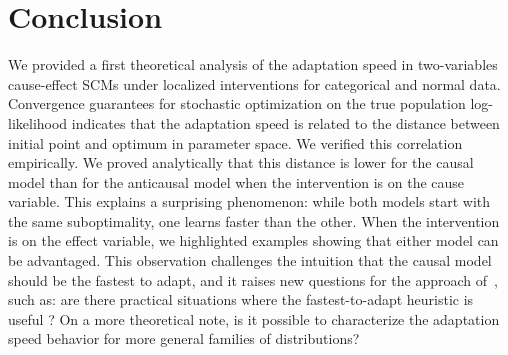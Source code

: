\section*{Conclusion}
We provided a first theoretical analysis of the adaptation speed in two-variables cause-effect SCMs under localized interventions for categorical and normal data.
Convergence guarantees for stochastic optimization on the true population log-likelihood indicates that the adaptation speed is related to the distance between initial point and optimum in parameter space.
We verified this correlation empirically. 
We proved analytically that this distance is lower for the causal model than for the anticausal model when the intervention is on the cause variable.
This explains a surprising phenomenon: while both models start with the same suboptimality, one learns faster than the other.
When the intervention is on the effect variable, we highlighted examples showing that either model can be advantaged.
This observation challenges the intuition that the causal model should be the fastest to adapt, and it raises new questions for the approach of~\citet{bengio2019meta}, such as: are there practical situations where the fastest-to-adapt heuristic is useful ? 
On a more theoretical note, is it possible to characterize the adaptation speed behavior for more general families of distributions? 

%
%

\clearpage
\newpage

